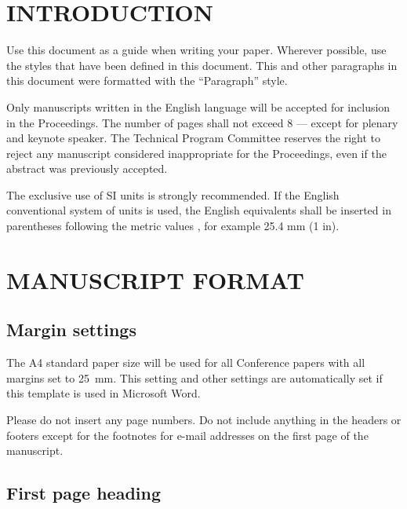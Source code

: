 \section{\uppercase{Introduction}}

Use this document as a guide when writing your paper. Wherever possible, use the styles that have been defined in this document. This and other paragraphs in this document were formatted with the ``Paragraph'' style.

Only manuscripts written in the English language will be accepted for inclusion in the Proceedings. The number of pages shall not exceed 8 --- except for plenary and keynote speaker. The Technical Program Committee reserves the right to reject any manuscript considered inappropriate for the Proceedings, even if the abstract was previously accepted.

The exclusive use of SI units is strongly recommended. If the English conventional system of units is used, the English equivalents shall be inserted in parentheses following the metric values , for example 25.4 mm (1 in).

\section{\uppercase{Manuscript format}}

\subsection{Margin settings}

The A4 standard paper size will be used for all Conference papers with all margins set to 25~mm. This setting and other settings are automatically set if this template is used in Microsoft Word.

Please do not insert any page numbers. Do not include anything in the headers or footers except for the footnotes for e-mail addresses on the first page of the manuscript.

\subsection{First page heading}

